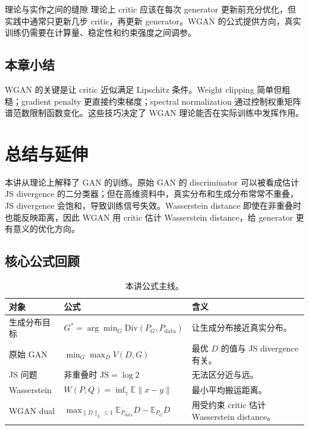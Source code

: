 \documentclass[a4paper]{article}
\begin{document}
\begin{warningbox}{理论与实作之间的缝隙}
    理论上 critic 应该在每次 generator 更新前充分优化，但实践中通常只更新几步 critic，再更新 generator。WGAN 的公式提供方向，真实训练仍需要在计算量、稳定性和约束强度之间调参。
\end{warningbox}

\subsection{本章小结}

WGAN 的关键是让 critic 近似满足 Lipschitz 条件。Weight clipping 简单但粗糙；gradient penalty 更直接约束梯度；spectral normalization 通过控制权重矩阵谱范数限制函数变化。这些技巧决定了 WGAN 理论能否在实际训练中发挥作用。

\section{总结与延伸}

本讲从理论上解释了 GAN 的训练。原始 GAN 的 discriminator 可以被看成估计 JS divergence 的二分类器；但在高维资料中，真实分布和生成分布常常不重叠，JS divergence 会饱和，导致训练信号失效。Wasserstein distance 即使在非重叠时也能反映距离，因此 WGAN 用 critic 估计 Wasserstein distance，给 generator 更有意义的优化方向。

\subsection{核心公式回顾}

\begin{table}[H]
    \centering
    \begin{tabular}{@{}L{0.24\textwidth}L{0.42\textwidth}L{0.24\textwidth}@{}}
        \toprule
        对象 & 公式 & 含义 \\
        \midrule
        生成分布目标 &
        $G^\ast=\arg\min_G \mathrm{Div}(P_G,P_{\mathrm{data}})$ &
        让生成分布接近真实分布。 \\
        原始 GAN &
        $\min_G\max_D V(D,G)$ &
        最优 $D$ 的值与 JS divergence 有关。 \\
        JS 问题 &
        非重叠时 $\mathrm{JS}=\log 2$ &
        无法区分近与远。 \\
        Wasserstein &
        $W(P,Q)=\inf_{\gamma}\mathbb{E}\|x-y\|$ &
        最小平均搬运距离。 \\
        WGAN dual &
        $\max_{\|D\|_L\le1}\mathbb{E}_{P_{\mathrm{data}}}D-\mathbb{E}_{P_G}D$ &
        用受约束 critic 估计 Wasserstein distance。 \\
        \bottomrule
    \end{tabular}
    \caption{本讲公式主线。}
    \label{tab:formula-summary}
\end{table}
\end{document}
